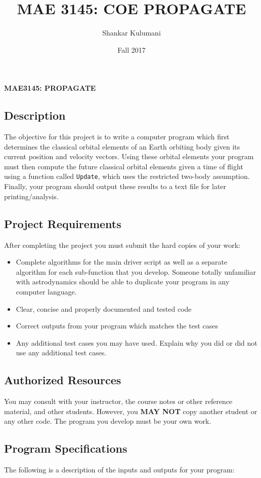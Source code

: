 \documentclass[11pt, reqno]{article}    %
\title{MAE 3145: COE PROPAGATE}
\author{Shankar Kulumani}
\date{Fall 2017}                          %
\begin{document}
\begin{center}
{\Large \textbf{MAE3145: PROPAGATE}}
\end{center}
\subsection*{Description}

The objective for this project is to write a computer program which first determines the classical orbital elements of an Earth orbiting body given its current position and velocity vectors. 
Using these orbital elements your program must then compute the future classical orbital elements given a time of flight using a function called \texttt{Update}, which uses the restricted two-body assumption.
Finally, your program should output these results to a text file for later printing/analysis. 

\subsection*{Project Requirements}
After completing the project you must submit the hard copies of your work:
\begin{itemize}
    \item Complete algorithms for the main driver script as well as a separate algorithm for each sub-function that you develop.
        Someone totally unfamiliar with astrodynamics should be able to duplicate your program in any computer language.
    \item Clear, concise and properly documented and tested code
    \item Correct outputs from your program which matches the test cases
    \item Any additional test cases you may have used. 
        Explain why you did or did not use any additional test cases.
\end{itemize}

\subsection*{Authorized Resources}
You may consult with your instructor, the course notes or other reference material, and other students. 
However, you \textbf{MAY NOT} copy another student or any other code. 
The program you develop must be your own work.

\subsection*{Program Specifications}
The following is a description of the inputs and outputs for your program:
\end{document}

